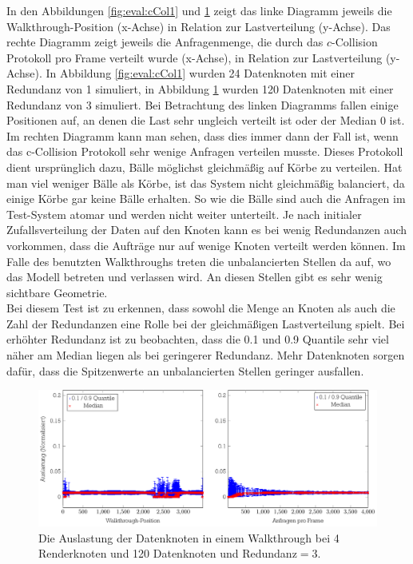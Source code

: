 In den Abbildungen \ref{fig:eval:cCol1} und \ref{fig:eval:cCol9} zeigt das linke Diagramm jeweils die Walkthrough-Position (x-Achse) in Relation zur Lastverteilung (y-Achse). Das rechte Diagramm zeigt jeweils die Anfragenmenge, die durch das $c$-Collision Protokoll pro Frame verteilt wurde (x-Achse), in Relation zur Lastverteilung (y-Achse). In Abbildung \ref{fig:eval:cCol1} wurden 24 Datenknoten mit einer Redundanz von 1 simuliert, in Abbildung \ref{fig:eval:cCol9} wurden 120 Datenknoten mit einer Redundanz von 3 simuliert. Bei Betrachtung des linken Diagramms fallen einige Positionen auf, an denen die Last sehr ungleich verteilt ist oder der Median 0 ist. Im rechten Diagramm kann man sehen, dass dies immer dann der Fall ist, wenn das c-Collision Protokoll sehr wenige Anfragen verteilen musste. Dieses Protokoll dient ursprünglich dazu, Bälle möglichst gleichmäßig auf Körbe zu verteilen. Hat man viel weniger Bälle als Körbe, ist das System nicht gleichmäßig balanciert, da einige Körbe gar keine Bälle erhalten. So wie die Bälle sind auch die Anfragen im Test-System atomar und werden nicht weiter unterteilt. Je nach initialer Zufallsverteilung der Daten auf den Knoten kann es bei wenig Redundanzen auch vorkommen, dass die Aufträge nur auf wenige Knoten verteilt werden können. Im Falle des benutzten Walkthroughs treten die unbalancierten Stellen da auf, wo das Modell betreten und verlassen wird. An diesen Stellen gibt es sehr wenig sichtbare Geometrie.\\
Bei diesem Test ist zu erkennen, dass sowohl die Menge an Knoten als auch die Zahl der Redundanzen eine Rolle bei der gleichmäßigen Lastverteilung spielt. Bei erhöhter Redundanz ist zu beobachten, dass die 0.1 und 0.9 Quantile sehr viel näher am Median liegen als bei geringerer Redundanz. Mehr Datenknoten sorgen dafür, dass die Spitzenwerte an unbalancierten Stellen geringer ausfallen.
\begin{figure}
 \centering
\includegraphics[scale=0.75]{images/diag_cCol_red3_render4_data120_2x.pdf}
  \caption{\label{fig:eval:cCol9}Die Auslastung der Datenknoten in einem Walkthrough bei 4 Renderknoten und 120 Datenknoten und Redundanz$=$3.}
\end{figure}

